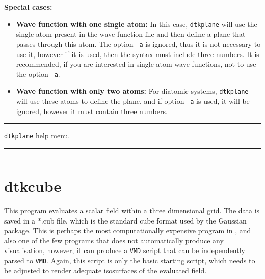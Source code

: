 \textbf{Special cases:}
\begin{itemize}
   \item \textbf{Wave function with one single atom:} In this case, \texttt{dtkplane} will use the single atom present in the wave function file and then define a plane that passes through this atom. The option \texttt{-a} is ignored, thus it is not necessary to use it, however if it is used, then the syntax must include three numbers. It is recommended, if you are interested in single atom wave functions, not to use the option \texttt{-a}.
   \item \textbf{Wave function with only two atoms:} For diatomic systems, \texttt{dtkplane} will use these atoms to define the plane, and if option \texttt{-a} is used, it will be ignored, however it must contain three numbers.
\end{itemize}

\rule{\textwidth}{1pt}
{\center\texttt{dtkplane} help menu.\\}
\rule{\textwidth}{1pt}
\begin{footnotesize}
\end{footnotesize}
\rule{\textwidth}{1pt}
\section{dtkcube}\label{sec:dtkcube}

This program evaluates a scalar field within a three dimensional grid. The data is saved
in a *.cub file, which is the standard cube format used by the Gaussian~\cite{bib:gaussian09}
package. This is perhaps the most computationally expensive program in \DTK{}, and also
one of the few programs that does not automatically produce any visualisation, however,
it can produce a \texttt{VMD} script that can be independently parsed to \texttt{VMD}.
Again, this script is only the basic starting script, which needs to be adjusted to render
adequate isosurfaces of the evaluated field.

